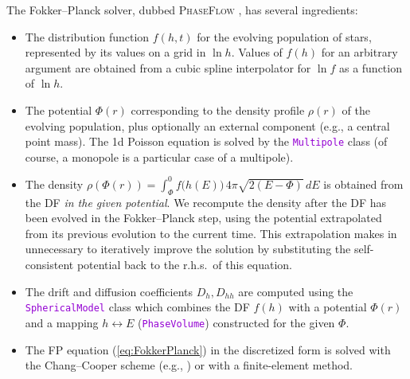 \documentclass[12pt]{article}
\newcommand{\ttt}[1]{\textcolor{darkviolet}{\texttt{#1}}}
\begin{document}
The Fokker--Planck solver, dubbed \textsc{PhaseFlow} \cite{Vasiliev2017}, has several ingredients:
\begin{itemize}
\item The distribution function $f(h,t)$ for the evolving population of stars, represented by its values on a grid in $\ln h$. Values of $f(h)$ for an arbitrary argument are obtained from a cubic spline interpolator for $\ln f$ as a function of $\ln h$.
\item The potential $\Phi(r)$ corresponding to the density profile $\rho(r)$ of the evolving population, plus optionally an external component (e.g., a central point mass). The 1d Poisson equation is solved by the \ttt{Multipole} class (of course, a monopole is a particular case of a multipole).
\item The density $\rho(\Phi(r)) = \int_{\Phi}^0 f\big(h(E)\big)\,4\pi\sqrt{2(E-\Phi)}\,dE$ is obtained from the DF \textit{in the given potential}. We recompute the density after the DF has been evolved in the Fokker--Planck step, using the potential extrapolated from its previous evolution to the current time. This extrapolation makes in unnecessary to iteratively improve the solution by substituting the self-consistent potential back to the r.h.s.\ of this equation.
\item The drift and diffusion coefficients $D_h, D_{hh}$ are computed using the \ttt{SphericalModel} class which combines the DF $f(h)$ with a potential $\Phi(r)$ and a mapping $h\leftrightarrow E$ (\ttt{PhaseVolume}) constructed for the given $\Phi$.
\item The FP equation (\ref{eq:FokkerPlanck}) in the discretized form is solved with the Chang--Cooper scheme (e.g., \cite{ParkPetrosian1996}) or with a finite-element method.
\end{itemize}

\newpage
{}
\end{document}
